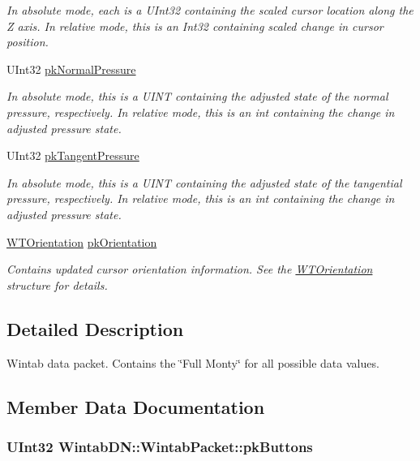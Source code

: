 \begin{DoxyCompactItemize}
\begin{DoxyCompactList}\small\item\em In absolute mode, each is a UInt32 containing the scaled cursor location along the Z axis. In relative mode, this is an Int32 containing scaled change in cursor position. \item\end{DoxyCompactList}\item 
UInt32 \hyperlink{struct_wintab_d_n_1_1_wintab_packet_a9b097766cb4ac1294d439031babe7d1f}{pkNormalPressure}
\begin{DoxyCompactList}\small\item\em In absolute mode, this is a UINT containing the adjusted state of the normal pressure, respectively. In relative mode, this is an int containing the change in adjusted pressure state. \item\end{DoxyCompactList}\item 
UInt32 \hyperlink{struct_wintab_d_n_1_1_wintab_packet_ae2b75ebf41312002c632ba8ff9e46258}{pkTangentPressure}
\begin{DoxyCompactList}\small\item\em In absolute mode, this is a UINT containing the adjusted state of the tangential pressure, respectively. In relative mode, this is an int containing the change in adjusted pressure state. \item\end{DoxyCompactList}\item 
\hyperlink{struct_wintab_d_n_1_1_w_t_orientation}{WTOrientation} \hyperlink{struct_wintab_d_n_1_1_wintab_packet_a75a992e71d4c430f5eb5211e19ca1b32}{pkOrientation}
\begin{DoxyCompactList}\small\item\em Contains updated cursor orientation information. See the \hyperlink{struct_wintab_d_n_1_1_w_t_orientation}{WTOrientation} structure for details. \item\end{DoxyCompactList}\end{DoxyCompactItemize}


\subsection{Detailed Description}
Wintab data packet. Contains the \char`\"{}Full Monty\char`\"{} for all possible data values. 

\subsection{Member Data Documentation}
\hypertarget{struct_wintab_d_n_1_1_wintab_packet_a069d68ce089ae275eb30fd4b2746ad97}{
\subsubsection[{pkButtons}]{\setlength{\rightskip}{0pt plus 5cm}UInt32 {\bf WintabDN::WintabPacket::pkButtons}}}
\label{struct_wintab_d_n_1_1_wintab_packet_a069d68ce089ae275eb30fd4b2746ad97}


